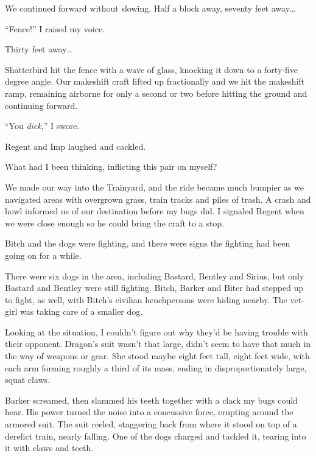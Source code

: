 We continued forward without slowing.  Half a block away, seventy feet away\ldots



``Fence!'' I raised my voice.



Thirty feet away\ldots



Shatterbird hit the fence with a wave of glass, knocking it down to a forty-five degree angle.  Our makeshift craft lifted up fractionally and we hit the makeshift ramp, remaining airborne for only a second or two before hitting the ground and continuing forward.



``You \emph{dick},'' I swore.



Regent and Imp laughed and cackled.



What had I been thinking, inflicting this pair on myself?



We made our way into the Trainyard, and the ride became much bumpier as we navigated areas with overgrown grass, train tracks and piles of trash.  A crash and howl informed us of our destination before my bugs did.  I signaled Regent when we were close enough so he could bring the craft to a stop.



Bitch and the dogs were fighting, and there were signs the fighting had been going on for a while.



There were six dogs in the area, including Bastard, Bentley and Sirius, but only Bastard and Bentley were still fighting.  Bitch, Barker and Biter had stepped up to fight, as well, with Bitch's civilian henchpersons were hiding nearby.  The vet-girl was taking care of a smaller dog.



Looking at the situation, I couldn't figure out why they'd be having trouble with their opponent.  Dragon's suit wasn't that large, didn't seem to have that much in the way of weapons or gear.  She stood maybe eight feet tall, eight feet wide, with each arm forming roughly a third of its mass, ending in disproportionately large, squat claws.



Barker screamed, then slammed his teeth together with a clack my bugs could hear.  His power turned the noise into a concussive force, erupting around the armored suit.  The suit reeled, staggering back from where it stood on top of a derelict train, nearly falling.  One of the dogs charged and tackled it, tearing into it with claws and teeth.



